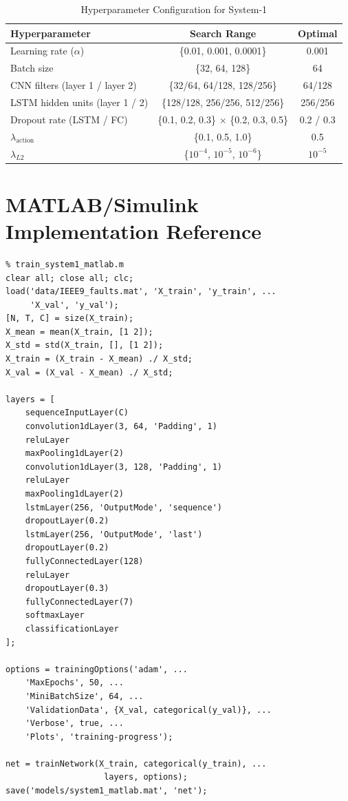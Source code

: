 \documentclass[journal]{IEEEtran}
\begin{document}
\begin{table}[h]
\centering
\caption{Hyperparameter Configuration for System-1}
\label{tab:hyperparams}
\begin{tabular}{lcc}
\toprule
\textbf{Hyperparameter} & \textbf{Search Range} & \textbf{Optimal} \\
\midrule
Learning rate ($\alpha$)            & \{0.01, 0.001, 0.0001\} & 0.001 \\
Batch size                          & \{32, 64, 128\}         & 64 \\
CNN filters (layer 1 / layer 2)     & \{32/64, 64/128, 128/256\} & 64/128 \\
LSTM hidden units (layer 1 / 2)     & \{128/128, 256/256, 512/256\} & 256/256 \\
Dropout rate (LSTM / FC)           & \{0.1, 0.2, 0.3\} $\times$ \{0.2, 0.3, 0.5\} & 0.2 / 0.3 \\
$\lambda_{\text{action}}$           & \{0.1, 0.5, 1.0\}      & 0.5 \\
$\lambda_{L2}$                      & \{$10^{-4}$, $10^{-5}$, $10^{-6}$\} & $10^{-5}$ \\
\bottomrule
\end{tabular}
\end{table}

\section{MATLAB/Simulink Implementation Reference}
\label{app:matlab}

\begin{verbatim}
% train_system1_matlab.m
clear all; close all; clc;
load('data/IEEE9_faults.mat', 'X_train', 'y_train', ...
     'X_val', 'y_val');
[N, T, C] = size(X_train);
X_mean = mean(X_train, [1 2]);
X_std = std(X_train, [], [1 2]);
X_train = (X_train - X_mean) ./ X_std;
X_val = (X_val - X_mean) ./ X_std;

layers = [
    sequenceInputLayer(C)
    convolution1dLayer(3, 64, 'Padding', 1)
    reluLayer
    maxPooling1dLayer(2)
    convolution1dLayer(3, 128, 'Padding', 1)
    reluLayer
    maxPooling1dLayer(2)
    lstmLayer(256, 'OutputMode', 'sequence')
    dropoutLayer(0.2)
    lstmLayer(256, 'OutputMode', 'last')
    dropoutLayer(0.2)
    fullyConnectedLayer(128)
    reluLayer
    dropoutLayer(0.3)
    fullyConnectedLayer(7)
    softmaxLayer
    classificationLayer
];

options = trainingOptions('adam', ...
    'MaxEpochs', 50, ...
    'MiniBatchSize', 64, ...
    'ValidationData', {X_val, categorical(y_val)}, ...
    'Verbose', true, ...
    'Plots', 'training-progress');

net = trainNetwork(X_train, categorical(y_train), ...
                    layers, options);
save('models/system1_matlab.mat', 'net');
\end{verbatim}
\end{document}
